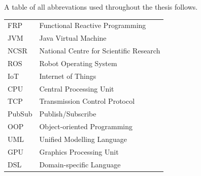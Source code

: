 \documentclass{dithesis}
\begin{document}




\begin{thesisabbreviations}
A table of all abbrevations used throughout the thesis follows.

\begin{tabularx}{\textwidth}{|X|X|}
  \hline
  FRP & Functional Reactive Programming \\
  JVM & Java Virtual Machine \\
  NCSR & National Centre for Scientific Research \\
  ROS & Robot Operating System \\
  IoT & Internet of Things \\
  CPU & Central Processing Unit \\
  TCP & Transmission Control Protocol \\
  PubSub & Publish/Subscribe \\
  OOP & Object-oriented Programming \\
  UML & Unified Modelling Language \\
  GPU & Graphics Processing Unit \\
  DSL & Domain-specific Language \\
  \hline
\end{tabularx}

\end{thesisabbreviations}

\newpage

{}
\end{document}
